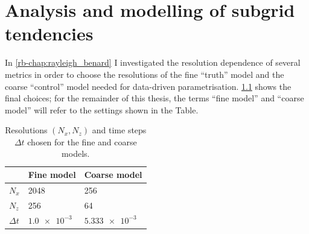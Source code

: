 \documentclass[../main.tex]{subfiles}
\begin{document}
\ifSubfilesClassLoaded{
    \frontmatter
    \tableofcontents
    \mainmatter
}{}

\chapter{Analysis and modelling of subgrid tendencies}
\label{chap:tendencies}
\setlength{\epigraphwidth}{.45\textwidth}


In \cref{rb-chap:rayleigh_benard} I investigated the resolution dependence
of several metrics in order to choose the resolutions of the fine ``truth''
model and the coarse ``control'' model needed for data-driven parametrisation.
\cref{tab:final_resolutions} shows the final choices; for the remainder
of this thesis, the terms ``fine model'' and ``coarse model'' will refer
to the settings shown in the Table.

\begin{table}[ht]
\centering
\begin{tabular}{l l l}
    \toprule
    & \textbf{Fine model} & \textbf{Coarse model} \\
    \midrule
    $N_x$ & 2048 & 256 \\
    $N_z$ & 256 & 64 \\
    $\Delta t$ & $\SI{1.0e-3}{}$ & $\SI{5.333e-3}{}$ \\
    \bottomrule
\end{tabular}
\caption{
    Resolutions $(N_x, N_z)$ and time steps $\Delta t$ chosen for the fine and
    coarse models.
}
\label{tab:final_resolutions}
\end{table}
\end{document}
